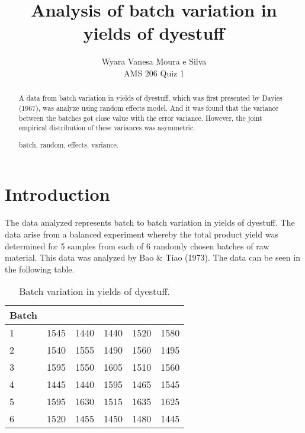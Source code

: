 \documentclass{asaproc}
\title{Analysis of batch variation in yields of dyestuff}
\author{Wyara Vanesa Moura e Silva\\
AMS 206 Quiz 1\\}
\begin{document}
\maketitle


\begin{abstract}

A data from batch variation in yields of dyestuff, which was first presented by Davies (1967), was analyze using random effects model. And it was found that the variance between the batches got close value with the error variance. However, the joint empirical distribution of these variances was asymmetric.

\begin{keywords}
batch, random, effects, variance.
\end{keywords}
\end{abstract}

\section{Introduction}

The data analyzed represents batch to batch variation in yields of dyestuff. The data arise from a balanced experiment whereby the total product yield was determined for 5 samples from each of 6 randomly chosen batches of raw material. This data was analyzed by Bao \& Tiao (1973). The data can be seen in the following table.

\begin{table}[H]
\caption{Batch variation in yields of dyestuff.}\label{data}
\centering
\begin{tabular}{lccccc}
\hline
\mbox{Batch} & & & & & \\
\hline
1 & 1545 & 1440 & 1440 & 1520 & 1580 \\

2 & 1540 & 1555 & 1490 &  1560 & 1495\\

3 & 1595 & 1550 & 1605 & 1510 & 1560 \\

4 & 1445 & 1440 & 1595 & 1465 & 1545 \\

5 & 1595 & 1630 & 1515 & 1635 & 1625 \\

6 & 1520 & 1455 & 1450 & 1480 & 1445 \\
\hline
\end{tabular}
\end{table}
\end{document}
